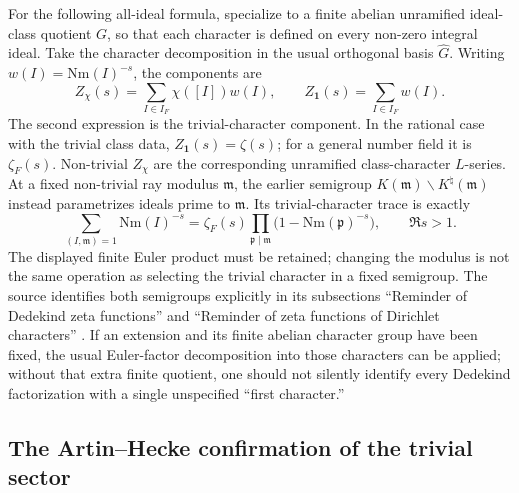 For the following all-ideal formula, specialize to a finite abelian
unramified ideal-class quotient $G$, so that each character is defined on
every non-zero integral ideal. Take the character decomposition in the
usual orthogonal basis $\widehat G$. Writing
$w(I)=\mathrm{Nm}(I)^{-s}$, the components are
\begin{equation}
 Z_\chi(s)=\sum_{I\in I_F}\chi([I])w(I),
 \qquad
 Z_{\mathbf 1}(s)=\sum_{I\in I_F}w(I).
 \label{eq:bcm-character-components}
\end{equation}
The second expression is the trivial-character component.  In the rational
case with the trivial class data, $Z_{\mathbf 1}(s)=\zeta(s)$; for a general
number field it is $\zeta_F(s)$. Non-trivial $Z_\chi$ are the corresponding
unramified class-character $L$-series. At a fixed non-trivial ray modulus
$\mathfrak m$, the earlier semigroup
$K(\mathfrak m)\backslash K^\natural(\mathfrak m)$ instead parametrizes
ideals prime to $\mathfrak m$. Its trivial-character trace is exactly
\[
 \sum_{(I,\mathfrak m)=1}\mathrm{Nm}(I)^{-s}
 =\zeta_F(s)\prod_{\mathfrak p\mid\mathfrak m}
   \bigl(1-\mathrm{Nm}(\mathfrak p)^{-s}\bigr),\qquad \Re s>1.
\]
The displayed finite Euler product must be retained; changing the modulus
is not the same operation as selecting the trivial character in a fixed
semigroup. The source identifies both semigroups explicitly in its
subsections ``Reminder of Dedekind zeta functions'' and ``Reminder of zeta
functions of Dirichlet characters'' \cite{haPaugam2005}.
If an extension and its finite abelian character
group have been fixed, the usual Euler-factor decomposition into those
characters can be applied; without that extra finite quotient, one should not
silently identify every Dedekind factorization with a single unspecified
``first character.''

\subsection{The Artin--Hecke confirmation of the trivial sector}

